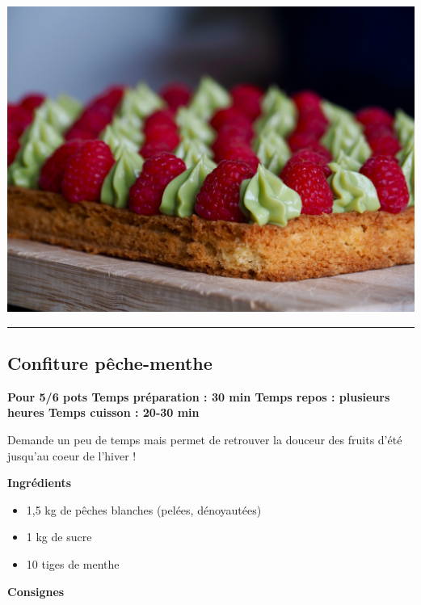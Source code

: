 \documentclass[]{book}
\providecommand{\tightlist}{%
  \setlength{\itemsep}{0pt}\setlength{\parskip}{0pt}}
\begin{document}
\begin{center}\includegraphics[width=0.9\linewidth]{photos/framb_matcha2} \end{center}

\begin{center}\rule{0.5\linewidth}{0.5pt}\end{center}

\hypertarget{confiture-puxeache-menthe}{%
\subsection*{\texorpdfstring{{Confiture pêche-menthe}}{Confiture pêche-menthe}}\label{confiture-puxeache-menthe}}

\begin{sucrebox}
\textbf{Pour 5/6 pots \textbar{} Temps préparation : 30 min \textbar{}
Temps repos : plusieurs heures\textbar{} Temps cuisson : 20-30 min}

Demande un peu de temps mais permet de retrouver la douceur des fruits
d'été jusqu'au coeur de l'hiver !
\end{sucrebox}

\textbf{Ingrédients}

\begin{itemize}
\tightlist
\item
  1,5 kg de pêches blanches (pelées, dénoyautées)
\item
  1 kg de sucre
\item
  10 tiges de menthe
\end{itemize}

\textbf{Consignes}
\end{document}

